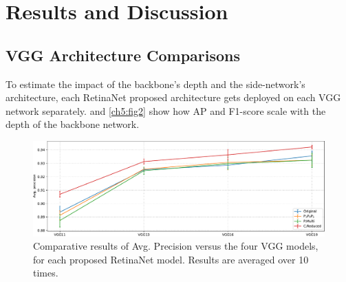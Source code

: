 \chapter{Results and Discussion} \label{Chapter:Results}

\section{VGG Architecture Comparisons}
To estimate the impact of the backbone's depth and the side-network's architecture, each RetinaNet proposed architecture gets deployed on each VGG network separately.  and \ref{ch5:fig2} show how AP and F1-score scale with the depth of the backbone network.   

\begin{figure}[!htb]
  \centering
  \includegraphics[width=\textwidth]{figures/ch5/fig1.pdf}
  \caption{Comparative results of Avg. Precision versus the four VGG models, for each proposed RetinaNet model. Results are averaged over 10 times.}
  \label{ch5:fig1}
\end{figure}

\begin{table}[!htb]
  \centering
  \caption{Indicative values of the Avg. Precision for the selected four VGG models, for each proposed RetinaNet model (). Parentheses indicate the input resolution.}
  \label{ch5:tab1}
\end{table}

